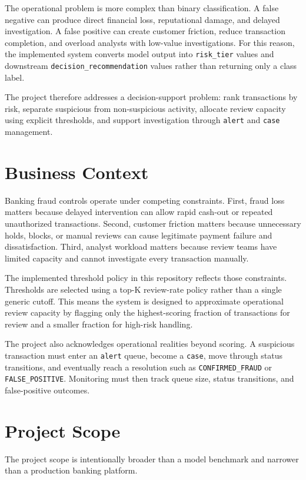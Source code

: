 \documentclass[11pt]{article}
\newcommand{\code}[1]{\texttt{#1}}
\begin{document}
The operational problem is more complex than binary classification. A false negative can produce direct financial loss, reputational damage, and delayed investigation. A false positive can create customer friction, reduce transaction completion, and overload analysts with low-value investigations. For this reason, the implemented system converts model output into \code{risk_tier} values and downstream \code{decision_recommendation} values rather than returning only a class label.

The project therefore addresses a decision-support problem: rank transactions by risk, separate suspicious from non-suspicious activity, allocate review capacity using explicit thresholds, and support investigation through \code{alert} and \code{case} management.

\section{Business Context}
Banking fraud controls operate under competing constraints. First, fraud loss matters because delayed intervention can allow rapid cash-out or repeated unauthorized transactions. Second, customer friction matters because unnecessary holds, blocks, or manual reviews can cause legitimate payment failure and dissatisfaction. Third, analyst workload matters because review teams have limited capacity and cannot investigate every transaction manually.

The implemented threshold policy in this repository reflects those constraints. Thresholds are selected using a top-K review-rate policy rather than a single generic cutoff. This means the system is designed to approximate operational review capacity by flagging only the highest-scoring fraction of transactions for review and a smaller fraction for high-risk handling.

The project also acknowledges operational realities beyond scoring. A suspicious transaction must enter an \code{alert} queue, become a \code{case}, move through status transitions, and eventually reach a resolution such as \code{CONFIRMED_FRAUD} or \code{FALSE_POSITIVE}. Monitoring must then track queue size, status transitions, and false-positive outcomes.

\section{Project Scope}
The project scope is intentionally broader than a model benchmark and narrower than a production banking platform.
\end{document}
